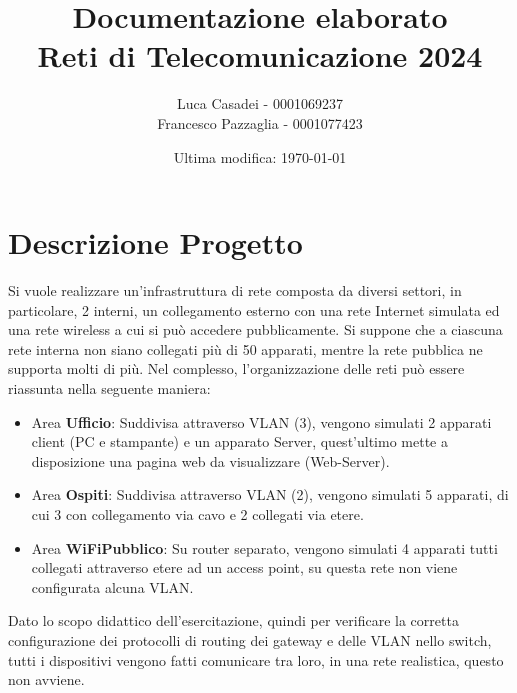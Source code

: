 \documentclass[a4paper]{article}
\title{\textbf{Documentazione elaborato\\Reti di Telecomunicazione 2024}}
\author{Luca Casadei - 0001069237\\Francesco Pazzaglia - 0001077423}
\date{Ultima modifica: \today}
\begin{document}
	\maketitle
	\section{Descrizione Progetto}
	Si vuole realizzare un'infrastruttura di rete composta da diversi settori, in particolare, 2 interni, un collegamento esterno con una rete Internet simulata ed una rete wireless a cui si può accedere pubblicamente. Si suppone che a ciascuna rete interna non siano collegati più di 50 apparati, mentre la rete pubblica ne supporta molti di più. Nel complesso, l'organizzazione delle reti può essere riassunta nella seguente maniera:
	\begin{itemize}
		\item Area \textbf{Ufficio}: Suddivisa attraverso VLAN (3), vengono simulati 2 apparati client (PC e stampante) e un apparato Server, quest'ultimo mette a disposizione una pagina web da visualizzare (Web-Server).
		\item Area \textbf{Ospiti}: Suddivisa attraverso VLAN (2), vengono simulati 5 apparati, di cui 3 con collegamento via cavo e 2 collegati via etere.
		\item Area \textbf{WiFiPubblico}: Su router separato, vengono simulati 4 apparati tutti collegati attraverso etere ad un access point, su questa rete non viene configurata alcuna VLAN.
	\end{itemize}
	Dato lo scopo didattico dell'esercitazione, quindi per verificare la corretta configurazione dei protocolli di routing dei gateway e delle VLAN nello switch, tutti i dispositivi vengono fatti comunicare tra loro, in una rete realistica, questo non avviene.
\end{document}
